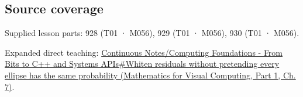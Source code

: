 \subsection{Source coverage}\label{appendix-12bbe185dbe5-source-coverage}

\hypertarget{appendix-12bbe185dbe5-source-coverage}{}

Supplied lesson parts: 928 (T01 · M056), 929 (T01 · M056), 930 (T01 · M056).

Expanded direct teaching: \href{../02-Mathematics-for-Visual-Computing-P01/main.pdf\#02-foundations-ii-ch023-whiten-residuals-without-pretending-every-ellipse-has-the-same-probability}{Continuous Notes/Computing Foundations - From Bits to C++ and Systems APIs\#Whiten residuals without pretending every ellipse has the same probability (Mathematics for Visual Computing, Part 1, Ch. 7)}.
